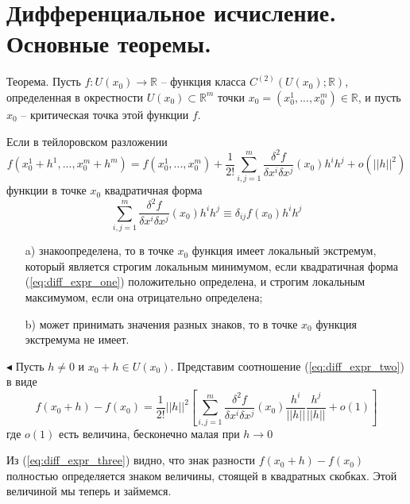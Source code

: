 \documentclass[a4paper, 12pt]{article} %
\begin{document}
\clearpage
\section*{Дифференциальное исчисление. Основные теоремы.}
Теорема. Пусть $f: U(x_0) \to \mathbb{R}$ -- функция класса $C^{(2)}(U(x_0); \mathbb{R})$, определенная в окрестности $U(x_0) \subset \mathbb{R}^m$ точки $x_0 = (x^1_0, ...,x^m_0) \in \mathbb{R}$, и пусть $x_0$ -- критическая точка этой функции $f$.

Если в тейлоровском разложении
\begin{equation}
    f(x^1_0+h^1, ..., x_0^m+h^m) = f(x_0^1, ..., x^m_0) + \frac{1}{2!} \sum^m_{i, j = 1} \frac{\delta^2 f}{\delta x^i \delta x^j} (x_0)h^i h^j + o(||h||^2)
    \label{eq:diff_expr_two}
\end{equation}
функции в точке $x_0$ квадратичная форма
\begin{equation}
    \sum_{i,j = 1}^m \frac{\delta^2 f}{\delta x^i \delta x^j} (x_0) h^i h^j \equiv \delta_{ij} f(x_0) h^i h^j
    \label{eq:diff_expr_one}
\end{equation}
\begin{enumerate}
    \item [a)] знакоопределена, то в точке $x_0$ функция имеет локальный экстремум, который является строгим локальным минимумом, если квадратичная форма (\ref{eq:diff_expr_one}) положительно определена, и строгим локальным максимумом, если она отрицательно определена;
    \item [b)] может принимать значения разных знаков, то в точке $x_0$ функция экстремума не имеет.
\end{enumerate}

$ \blacktriangleleft $ Пусть $h \neq 0$ и $x_0 + h \in U(x_0)$. Представим соотношение (\ref{eq:diff_expr_two}) в виде
\begin{equation}
    f(x_0 + h) - f(x_0) = \frac{1}{2!} ||h||^2 \left[ \sum^m_{i, j = 1} \frac{\delta^2 f}{\delta x^i \delta x^j} (x_0) \frac{h^i}{||h||} \frac{h^j}{||h||} + o(1) \right]
    \label{eq:diff_expr_three}
\end{equation}
где $o(1)$ есть величина, бесконечно малая при $h \to 0$

Из (\ref{eq:diff_expr_three}) видно, что знак разности $f(x_0 + h) - f(x_0)$ полностью определяется знаком величины, стоящей в квадратных скобках. Этой величиной мы теперь и займемся.

\clearpage
\end{document}
